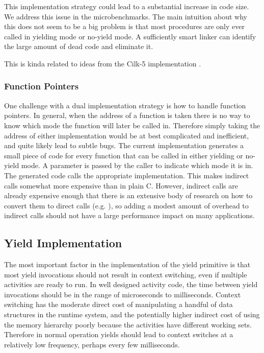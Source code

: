 \documentclass[10pt,preprint]{sigplanconf}
\begin{document}
This implementation strategy could lead to a substantial increase in code size.
We address this issue in the microbenchmarks.
The main intuition about why this does not seem to be a big problem is that most procedures are only ever called in yielding mode or no-yield mode.
A sufficiently smart linker can identify the large amount of dead code and eliminate it.

This is kinda related to ideas from the Cilk-5 implementation
\cite{Frigo1998}.

\subsubsection{Function Pointers}

One challenge with a dual implementation strategy is how to handle function pointers.
In general, when the address of a function is taken there is no way to know which mode the function will later be called in.
Therefore simply taking the address of either implementation would be at best complicated and inefficient, and quite likely lead to subtle bugs.
The current implementation generates a small piece of code for every function that can be called in either yielding or no-yield mode.
A parameter is passed by the caller to indicate which mode it is in.
The generated code calls the appropriate implementation.
This makes indirect calls somewhat more expensive than in plain C.
However, indirect calls are already expensive enough that there is an extensive body of research on how to convert them to direct calls (e.g. \cite{Dean1995}), so adding a modest amount of overhead to indirect calls should not have a large performance impact on many applications.

\subsection{Yield Implementation}

The most important factor in the implementation of the yield primitive is that most yield invocations should not result in context switching, even if multiple activities are ready to run.
In well designed activity code, the time between yield invocations should be in the range of microseconds to milliseconds.
Context switching has the moderate direct cost of manipulating a handful of data structures in the runtime system, and the potentially higher indirect cost of using the memory hierarchy poorly because the activities have different working sets.
Therefore in normal operation yields should lead to context switches at a relatively low frequency, perhaps every few milliseconds.
\end{document}
